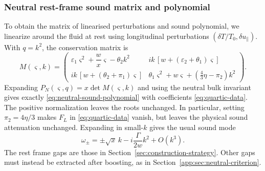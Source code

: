 \subsubsection{Neutral rest-frame sound matrix and polynomial}\label{app:neutral-matrix}
To obtain the matrix of linearised perturbations and sound polynomial, we linearize around the fluid at rest using longitudinal perturbations
$(\delta T/T_0,\delta u_\parallel)$. With $q=k^2$, the conservation matrix is
\begin{equation}\label{app:eq:neutral-matrix}
 M(\varsigma,k)=\begin{pmatrix}
 {\varepsilon_1}\varsigma^2+\dfrac{w}{x}\varsigma-{\theta_2}k^2
 &ik\,[w+({\varepsilon_2}+{\theta_1})\varsigma]\\[3pt]
 ik\,[w+({\theta_2}+{\pi_1})\varsigma]
 &{\theta_1}\varsigma^2+w\varsigma+(\frac43\eta-{\pi_2})k^2
 \end{pmatrix}.
\end{equation}
Expanding $P_N(\varsigma,q)=x\det M(\varsigma,k)$ and using the neutral
bulk invariant gives exactly \eqref{eq:neutral-sound-polynomial} with
coefficients \eqref{eq:quartic-data}. The positive normalization leaves
the roots unchanged.
In particular, setting $\pi_2=4\eta/3$ makes $F_L$ in
\eqref{eq:quartic-data} vanish, but leaves the physical sound attenuation
unchanged. Expanding in small-$k$ gives the usual sound mode
\begin{equation}
 \omega_\pm=\pm\sqrt{x}\,k-i\frac{\Gamma}{2w}k^2+O(k^3).
\end{equation}
The rest frame gaps are those in Section~\ref{sec:construction-strategy}.
Other gaps must  instead be extracted after boosting, as in Section~\ref{app:sec:neutral-criterion}.


